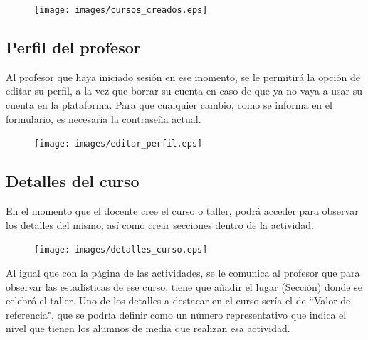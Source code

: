 \begin{figure}[!th]
\begin{center}
\texttt{[image: images/cursos\_creados.eps]}
\label{fig:14}
\end{center}
\end{figure}


\subsection{Perfil del profesor}
\label{1:sec:4}

Al profesor que haya iniciado sesión en ese momento, se le permitirá la opción de editar su perfil, a la vez que borrar su cuenta en caso de que ya no vaya a usar su cuenta en la plataforma.
Para que cualquier cambio, como se informa en el formulario, es necesaria la contraseña actual.

\begin{figure}[!th]
\begin{center}
\texttt{[image: images/editar\_perfil.eps]}
\label{fig:15}
\end{center}
\end{figure}


\subsection{Detalles del curso}
\label{1:sec:5}

En el momento que el docente cree el curso o taller, podrá acceder para observar los detalles del mismo, así como crear secciones dentro de la actividad.

\begin{figure}[!th]
\begin{center}
\texttt{[image: images/detalles\_curso.eps]}
\label{fig:16}
\end{center}
\end{figure}

Al igual que con la página de las actividades, se le comunica al profesor que para observar las estadísticas de ese curso, tiene que añadir el lugar (Sección) donde se celebró el taller.
Uno de los detalles a destacar en el curso sería el de ``Valor de referencia", que se podría definir como un número representativo que indica el nivel que tienen los alumnos de media que realizan
esa actividad.

